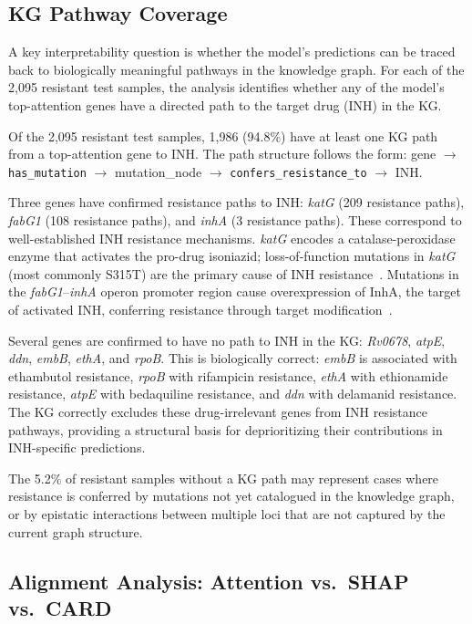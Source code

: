 \documentclass[conference]{IEEEtran}
\begin{document}
\subsection{KG Pathway Coverage}

A key interpretability question is whether the model's predictions can be traced back to biologically meaningful pathways in the knowledge graph. For each of the 2{,}095 resistant test samples, the analysis identifies whether any of the model's top-attention genes have a directed path to the target drug (INH) in the KG.

Of the 2{,}095 resistant test samples, 1{,}986 (94.8\%) have at least one KG path from a top-attention gene to INH. The path structure follows the form: gene $\rightarrow$ \texttt{has\_mutation} $\rightarrow$ mutation\_node $\rightarrow$ \texttt{confers\_resistance\_to} $\rightarrow$ INH.

Three genes have confirmed resistance paths to INH: \textit{katG} (209 resistance paths), \textit{fabG1} (108 resistance paths), and \textit{inhA} (3 resistance paths). These correspond to well-established INH resistance mechanisms. \textit{katG} encodes a catalase-peroxidase enzyme that activates the pro-drug isoniazid; loss-of-function mutations in \textit{katG} (most commonly S315T) are the primary cause of INH resistance~\cite{ref_katg}. Mutations in the \textit{fabG1}--\textit{inhA} operon promoter region cause overexpression of InhA, the target of activated INH, conferring resistance through target modification~\cite{ref_inha}.

Several genes are confirmed to have no path to INH in the KG: \textit{Rv0678}, \textit{atpE}, \textit{ddn}, \textit{embB}, \textit{ethA}, and \textit{rpoB}. This is biologically correct: \textit{embB} is associated with ethambutol resistance, \textit{rpoB} with rifampicin resistance, \textit{ethA} with ethionamide resistance, \textit{atpE} with bedaquiline resistance, and \textit{ddn} with delamanid resistance. The KG correctly excludes these drug-irrelevant genes from INH resistance pathways, providing a structural basis for deprioritizing their contributions in INH-specific predictions.

The 5.2\% of resistant samples without a KG path may represent cases where resistance is conferred by mutations not yet catalogued in the knowledge graph, or by epistatic interactions between multiple loci that are not captured by the current graph structure.

\subsection{Alignment Analysis: Attention vs.\ SHAP vs.\ CARD}
\end{document}
